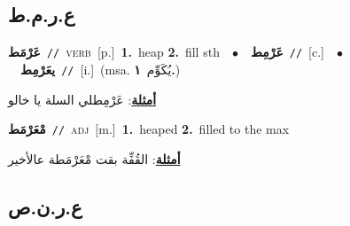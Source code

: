 \documentclass[10pt,a4paper,twoside]{article} %
\begin{document}
\begin{multicols}{2}
\vspace{-3mm}
\subsection*{\color{blue}\foreignlanguage{arabic}{ع.ر.م.ط}\color{blue}{}} 

{\setlength\topsep{0pt}\textbf{\foreignlanguage{arabic}{عَرْمَط}}\ {\color{gray}\texttt{//}\color{black}}\ \textsc{verb}\ [p.]\ \textbf{1.}~heap  \textbf{2.}~fill sth\ \ $\bullet$\ \ \setlength\topsep{0pt}\textbf{\foreignlanguage{arabic}{عَرْمِط}}\ {\color{gray}\texttt{//}\color{black}}\ [c.]\ \ $\bullet$\ \ \setlength\topsep{0pt}\textbf{\foreignlanguage{arabic}{يعَرْمِط}}\ {\color{gray}\texttt{//}\color{black}}\ [i.]\ \color{gray}(msa. \foreignlanguage{arabic}{يُكَوِّم}~\foreignlanguage{arabic}{\textbf{١.}})\color{black}\  \begin{flushright}\color{gray}\foreignlanguage{arabic}{\textbf{\underline{\foreignlanguage{arabic}{أمثلة}}}: عَرْمِطلي السلة يا خالو}\end{flushright}\color{black}} \vspace{2mm}

{\setlength\topsep{0pt}\textbf{\foreignlanguage{arabic}{مْعَرْمَط}}\ {\color{gray}\texttt{//}\color{black}}\ \textsc{adj}\ [m.]\ \textbf{1.}~heaped  \textbf{2.}~filled to the max\  \begin{flushright}\color{gray}\foreignlanguage{arabic}{\textbf{\underline{\foreignlanguage{arabic}{أمثلة}}}: القُفِّة بقت مْعَرْمَطة عالأخير}\end{flushright}\color{black}} \vspace{2mm}

\vspace{-3mm}
\subsection*{\color{blue}\foreignlanguage{arabic}{ع.ر.ن.ص}\color{blue}{}} 


\end{multicols}
\end{document}
